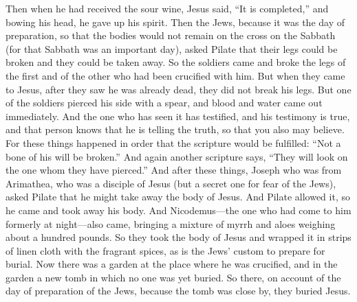 \begin{biblechapter}
\verse Then when he had received the sour wine, Jesus said, “It is completed,” and bowing his head, he gave up his spirit.
\verse Then the Jews, because it was the day of preparation, so that the bodies would not remain on the cross on the Sabbath (for that Sabbath was an important day), asked Pilate that their legs could be broken and they could be taken away.
\verse So the soldiers came and broke the legs of the first and of the other who had been crucified with him.
\verse But when they came to Jesus, after they saw he was already dead, they did not break his legs.
\verse But one of the soldiers pierced his side with a spear, and blood and water came out immediately.
\verse And the one who has seen it has testified, and his testimony is true, and that person knows that he is telling the truth, so that you also may believe.
\verse For these things happened in order that the scripture would be fulfilled: “Not a bone of his will be broken.”
\verse And again another scripture says, “They will look on the one whom they have pierced.”
 And after these things, Joseph who was from Arimathea, who was a disciple of Jesus (but a secret one for fear of the Jews), asked Pilate that he might take away the body of Jesus. And Pilate allowed it, so he came and took away his body.
\verse And Nicodemus—the one who had come to him formerly at night—also came, bringing a mixture of myrrh and aloes weighing about a hundred pounds.
\verse So they took the body of Jesus and wrapped it in strips of linen cloth with the fragrant spices, as is the Jews’ custom to prepare for burial.
\verse Now there was a garden at the place where he was crucified, and in the garden a new tomb in which no one was yet buried.
\verse So there, on account of the day of preparation of the Jews, because the tomb was close by, they buried Jesus.
\end{biblechapter}

